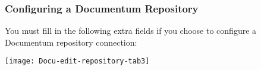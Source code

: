 %
%

\subsubsection{Configuring a Documentum Repository}

You must fill in the following extra fields if you choose to
configure a Documentum repository connection: 

\texttt{[image: Docu-edit-repository-tab3]}


